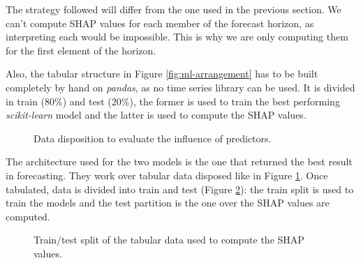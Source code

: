 The strategy followed will differ from the one used in the previous section. We can't compute SHAP values for each member of the forecast horizon, as interpreting each would be impossible. This is why we are only computing them for the first element of the horizon.

Also, the tabular structure in Figure \ref{fig:ml-arrangement} has to be built completely by hand on \textit{pandas}, as no time series library can be used. It is divided in train (80\%) and test (20\%), the former is used to train the best performing \textit{scikit-learn} model and the latter is used to compute the SHAP values.

\begin{figure}[H]
\centering
    \caption{Data disposition to evaluate the influence of predictors.}
    \label{fig:shap-arrangement}
\end{figure}

The architecture used for the two models is the one that returned the best result in forecasting. They work over tabular data disposed like in Figure \ref{fig:shap-arrangement}. Once tabulated, data is divided into train and test (Figure \ref{fig:shap-train-test}): the train split is used to train the models and the test partition is the one over the SHAP values are computed.

\begin{figure}[H]
\centering
    \caption{Train/test split of the tabular data used to compute the SHAP values.}
    \label{fig:shap-train-test}
\end{figure}


